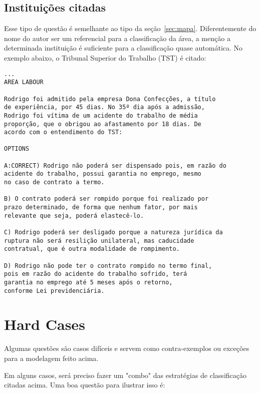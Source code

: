 \documentclass{article}
\begin{document}
\subsection{Instituições citadas}

Esse tipo de questão é semelhante ao tipo da
seção~\ref{sec:mapa}. Diferentemente do nome do autor ser um
referencial para a classificação da área, a menção a determinada
instituição é suficiente para a classificação quase automática. No
exemplo abaixo, o Tribunal Superior do Trabalho (TST) é citado:

\begin{verbatim}
...
AREA LABOUR
 
Rodrigo foi admitido pela empresa Dona Confecções, a título 
de experiência, por 45 dias. No 35º dia após a admissão, 
Rodrigo foi vítima de um acidente do trabalho de média 
proporção, que o obrigou ao afastamento por 18 dias. De 
acordo com o entendimento do TST: 
 
OPTIONS

A:CORRECT) Rodrigo não poderá ser dispensado pois, em razão do 
acidente do trabalho, possui garantia no emprego, mesmo 
no caso de contrato a termo.  

B) O contrato poderá ser rompido porque foi realizado por 
prazo determinado, de forma que nenhum fator, por mais 
relevante que seja, poderá elastecê-lo. 

C) Rodrigo poderá ser desligado porque a natureza jurídica da 
ruptura não será resilição unilateral, mas caducidade 
contratual, que é outra modalidade de rompimento. 

D) Rodrigo não pode ter o contrato rompido no termo final, 
pois em razão do acidente do trabalho sofrido, terá 
garantia no emprego até 5 meses após o retorno, 
conforme Lei previdenciária. 
\end{verbatim}

\section{Hard Cases}

Algumas questões são casos difíceis e servem como contra-exemplos ou
exceções para a modelagem feito acima.

Em alguns casos, será preciso fazer um "combo" das estratégias de
classificação citadas acima. Uma boa questão para ilustrar isso é:
\end{document}
